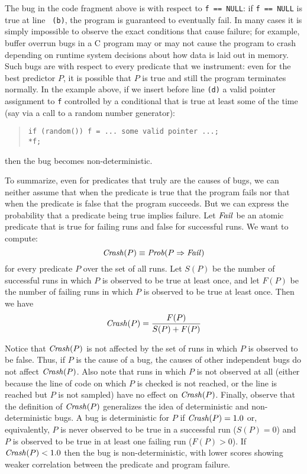 The bug in the code fragment above is  with
respect to {\tt f == NULL}: if {\tt f == NULL} is true at line {\tt
(b)}, the program is guaranteed to eventually fail.  In many cases it
is simply impossible to observe the exact conditions that cause
failure; for example, buffer overrun bugs in a C program may or may
not cause the program to crash depending on runtime system decisions
about how data is laid out in memory.  Such bugs are
 with respect to every predicate that we instrument:
even for the best predictor $P$, it is possible that $P$ is true and
still the program terminates normally.  In the example above, if we insert before line
{\tt (d)} a valid pointer  assignment to {\tt f} controlled by a conditional that is true
at least some of the time (say via a call to a random number generator):
\begin{quote}
\begin{verbatim}
if (random()) f = ... some valid pointer ...;
*f;
\end{verbatim}
\end{quote}
then the bug becomes non-deterministic.

To summarize, even for predicates that truly are the causes of bugs, we can neither assume that
when the predicate is true that
the program fails nor that when the predicate is false that
the program succeeds. But we can express the probability that a predicate
being true implies failure.  Let $\mbox{\textit{Fail}}$ be an atomic predicate that is
true for failing runs and false for successful runs.  We want to compute:
\[ \mbox{\textit{Crash}}(P) \equiv \mbox{\textit{Prob}}(P \Rightarrow \mbox{\textit{Fail}}) \]
for every predicate $P$ over the set of all runs.  Let $S(P)$ be the number
of successful runs in which $P$ is observed to be true at least once, and let $F(P)$ be the number of
failing runs in which $P$ is observed to be true at least once.  Then we have
\[ \mbox{\textit{Crash}}(P) = \frac{F(P)}{S(P) + F(P)} \]

Notice that $\mbox{\textit{Crash}}(P)$ is not affected by the set of runs in which
$P$ is observed to be false.  Thus, if $P$ is the cause of a bug, the
causes of other independent bugs do not affect $\mbox{\textit{Crash}}(P)$.
Also note that runs in which $P$ is not observed at all (either because
the line of code on which $P$ is checked is not reached, or the line is reached
but $P$ is not sampled) have no effect on $\mbox{\textit{Crash}}(P)$.
Finally, observe that the definition of $\mbox{\textit{Crash}}(P)$
generalizes the idea of deterministic and non-deterministic bugs.  A
bug is deterministic for $P$ if $\mbox{\textit{Crash}}(P) = 1.0$ or, equivalently,
$P$ is never observed to be true in a successful run ($S(P) =
0$) and $P$ is observed to be true in at least one failing run ($F(P) > 0$).
If $\mbox{\textit{Crash}}(P) < 1.0$ then the bug is non-deterministic, with
lower scores showing weaker correlation between the predicate and
program failure.

